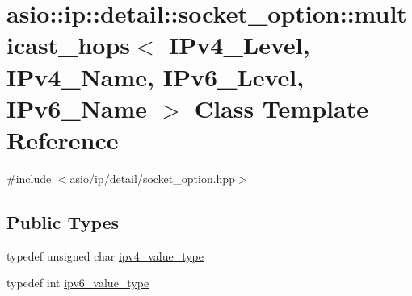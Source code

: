 \hypertarget{classasio_1_1ip_1_1detail_1_1socket__option_1_1multicast__hops}{}\section{asio\+:\+:ip\+:\+:detail\+:\+:socket\+\_\+option\+:\+:multicast\+\_\+hops$<$ I\+Pv4\+\_\+\+Level, I\+Pv4\+\_\+\+Name, I\+Pv6\+\_\+\+Level, I\+Pv6\+\_\+\+Name $>$ Class Template Reference}
\label{classasio_1_1ip_1_1detail_1_1socket__option_1_1multicast__hops}


{\ttfamily \#include $<$asio/ip/detail/socket\+\_\+option.\+hpp$>$}

\subsection*{Public Types}
\begin{DoxyCompactItemize}
\item 
typedef unsigned char \hyperlink{classasio_1_1ip_1_1detail_1_1socket__option_1_1multicast__hops_a0d02ef35af3a17021c1729cfed1aac37}{ipv4\+\_\+value\+\_\+type}
\item 
typedef int \hyperlink{classasio_1_1ip_1_1detail_1_1socket__option_1_1multicast__hops_a186549302284820cb23ca9271e45f371}{ipv6\+\_\+value\+\_\+type}
\end{DoxyCompactItemize}
